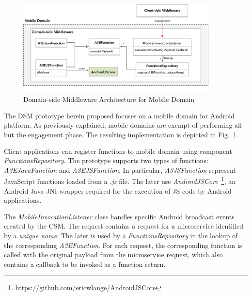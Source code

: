 \begin{figure}[tbp]
	\includegraphics[width=0.9\textwidth]{figs/a3e-mobiledomain-prototype}
	\caption{Domain-side Middleware Architecture for Mobile Domain}
	\label{fig:mobile-domain-prototype}
\end{figure}

The DSM prototype herein proposed focuses on a mobile domain for Android platform. As previously explained, mobile domains are exempt of performing all but the engagement phase. The resulting implementation is depicted in Fig.~\ref{fig:mobile-domain-prototype}.

Client applications can register functions to mobile domain using component \textit{FunctionsRepository}. The prototype supports two types of functions: \textit{A3EJavaFunction} and \textit{A3EJSFunction}. In particular, \textit{A3JSFunction} represent JavaScript functions loaded from a \textit{.js} file. The later use \textit{AndroidJSCore}~\footnote{https://github.com/ericwlange/AndroidJSCore}, an Android Java JNI wrapper required for the execution of JS code by Android applications.

The \textit{MobileInvocationListener} class handles specific Android broadcast events created by the CSM.  The request contains a request for a microservice identified by a \textit{unique name}. The later is used by a \textit{FunctionsRepository} in the lookup of the corresponding \textit{A3EFunction}. 
For each request, the corresponding function is called with the original payload from the microservice request, which also contains a callback to be invoked as a function return.


